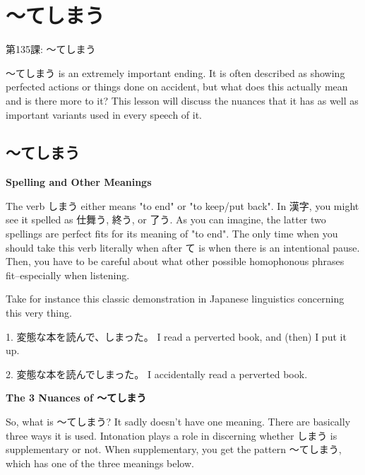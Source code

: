     
\chapter{～てしまう}

\begin{center}
\begin{Large}
第135課: ～てしまう 
\end{Large}
\end{center}
 
\par{ ～てしまう is an extremely important ending. It is often described as showing perfected actions or things done on accident, but what does this actually mean and is there more to it? This lesson will discuss the nuances that it has as well as important variants used in every speech of it. }
      
\section{～てしまう}
 
\par{ \textbf{Spelling and Other Meanings } }

\par{ The verb しまう either means "to end" or "to keep\slash put back". In 漢字, you might see it spelled as 仕舞う, 終う, or 了う. As you can imagine, the latter two spellings are perfect fits for its meaning of "to end". The only time when you should take this verb literally when after て is when there is an intentional pause. Then, you have to be careful about what other possible homophonous phrases fit--especially when listening. }

\par{ Take for instance this classic demonstration in Japanese linguistics concerning this very thing. }

\par{1. 変態な本を読んで、しまった。 \hfill\break
I read a perverted book, and (then) I put it up. }

\par{2. 変態な本を読んでしまった。 \hfill\break
I accidentally read a perverted book. }

\par{ \textbf{The 3 Nuances of ～てしまう }}

\par{ So, what is ～てしまう? It sadly doesn't have one meaning. There are basically three ways it is used. Intonation plays a role in discerning whether しまう is supplementary or not. When supplementary, you get the pattern ～てしまう, which has one of the three meanings below. }

